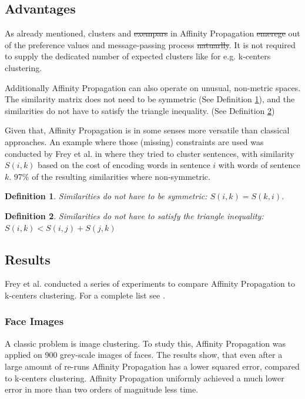 \documentclass[11pt,a4paper]{article}
\newtheorem{definition}{Definition}
\providecommand{\DIFadd}[1]{{\protect\color{blue}\uwave{#1}}} %
\providecommand{\DIFdel}[1]{{\protect\color{red}\sout{#1}}}                      %
\providecommand{\DIFaddbegin}{} %
\providecommand{\DIFaddend}{} %
\providecommand{\DIFdelbegin}{} %
\providecommand{\DIFdelend}{} %
\newcommand{\DIFscaledelfig}{0.5}
\newlength{\DIFdelgraphicswidth} %
\newlength{\DIFdelgraphicsheight} %
\newcommand{\DIFaddincludegraphics}[2][]{{\color{blue}\fbox{\DIFOincludegraphics[#1]{#2}}}} %
\newcommand{\DIFdelincludegraphics}[2][]{%
\sbox{\DIFdelgraphicsbox}{\DIFOincludegraphics[#1]{#2}}%
\settoboxwidth{\DIFdelgraphicswidth}{\DIFdelgraphicsbox} %
\settoboxtotalheight{\DIFdelgraphicsheight}{\DIFdelgraphicsbox} %
\scalebox{\DIFscaledelfig}{%
\parbox[b]{\DIFdelgraphicswidth}{\usebox{\DIFdelgraphicsbox}\\[-\baselineskip] \rule{\DIFdelgraphicswidth}{0em}}\llap{\resizebox{\DIFdelgraphicswidth}{\DIFdelgraphicsheight}{%
\setlength{\unitlength}{\DIFdelgraphicswidth}%
\begin{picture}(1,1)%
\thicklines\linethickness{2pt} %
{\color[rgb]{1,0,0}\put(0,0){\framebox(1,1){}}}%
{\color[rgb]{1,0,0}\put(0,0){\line( 1,1){1}}}%
{\color[rgb]{1,0,0}\put(0,1){\line(1,-1){1}}}%
\end{picture}%
}\hspace*{3pt}}} %
} %
\DeclareRobustCommand{\DIFaddbegin}{\DIFOaddbegin \let\includegraphics\DIFaddincludegraphics} %
\DeclareRobustCommand{\DIFaddend}{\DIFOaddend \let\includegraphics\DIFOincludegraphics} %
\DeclareRobustCommand{\DIFdelbegin}{\DIFOdelbegin \let\includegraphics\DIFdelincludegraphics} %
\DeclareRobustCommand{\DIFdelend}{\DIFOaddend \let\includegraphics\DIFOincludegraphics} %
\begin{document}
\subsection{Advantages}
As already mentioned, clusters and \DIFdelbegin \DIFdel{exempars }\DIFdelend \DIFaddbegin \DIFadd{exemplars }\DIFaddend in Affinity Propagation \DIFdelbegin \DIFdel{emerege }\DIFdelend \DIFaddbegin \DIFadd{emerge }\DIFaddend out of the preference values and message-passing process \DIFdelbegin \DIFdel{natuarlly}\DIFdelend \DIFaddbegin \DIFadd{naturally}\DIFaddend . It is not required to supply the dedicated number of expected clusters like for e.g. k-centers clustering. \cite{frey2007clustering}

Additionally Affinity Propagation can also operate on unusual, non-metric spaces. The similarity matrix does not need to be symmetric (See Definition \ref{def:symmetric}), and the similarities do not have to satisfy the triangle inequality. (See Definition \ref{def:triangleieq}) \cite{frey2007clustering}

Given that, Affinity Propagation is in some senses more versatile than classical approaches. An example where those (missing) constraints are used was conducted by Frey et al. in \cite{frey2007clustering} where they tried to cluster sentences, with similarity $S(i,k)$ based on the cost of encoding words in sentence $i$ with words of sentence $k$. 97\% of the resulting similarities where non-symmetric. \cite{frey2007clustering} 
\begin{definition}\label{def:symmetric}
	Similarities do not have to be symmetric: $S(i,k) = S(k,i)$.
\end{definition}
\begin{definition}\label{def:triangleieq}
	Similarities do not have to satisfy the triangle inequality: $S(i,k) < S(i,j) + S(j,k)$
\end{definition}
\subsection{Results}
Frey et al. conducted a series of experiments to compare Affinity Propagation to k-centers clustering. For a complete list see \cite{frey2007clustering}.
\subsubsection{Face Images}
A classic problem is image clustering. To study this, Affinity Propagation was applied on 900 grey-scale images of faces. The results show, that even after a large amount of re-runs Affinity Propagation has a lower squared error, compared to k-centers clustering. Affinity Propagation uniformly achieved a much lower error in more than two orders of magnitude less time. \cite{frey2007clustering}
\end{document}
